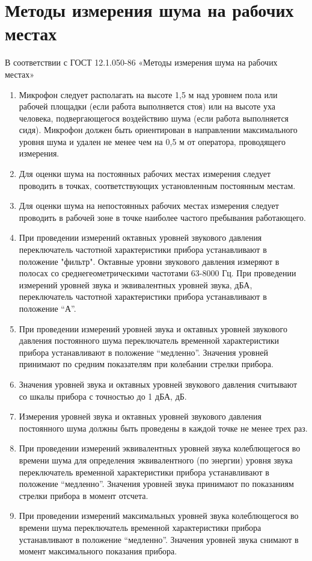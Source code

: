 \documentclass[a5paper, 12dd, twoside]{article}
\begin{document}
\section{Методы измерения шума на рабочих местах}
В соответствии с ГОСТ 12.1.050-86 «Методы измерения шума на рабочих местах»
\begin{enumerate}
    \item Микрофон следует располагать на высоте 1,5 м над уровнем пола или рабочей площадки (если работа выполняется стоя) или на высоте уха человека, подвергающегося воздействию шума (если работа выполняется сидя). Микрофон должен быть ориентирован в направлении максимального уровня шума и удален не менее чем на 0,5 м от оператора, проводящего измерения.
    \item Для оценки шума на постоянных рабочих местах измерения следует проводить в точках, соответствующих установленным постоянным местам.
    \item Для оценки шума на непостоянных рабочих местах измерения следует проводить в рабочей зоне в точке наиболее частого пребывания работающего.
    \item При проведении измерений октавных уровней звукового давления переключатель частотной характеристики прибора устанавливают в положение "фильтр". Октавные уровни звукового давления измеряют в полосах со среднегеометрическими частотами 63-8000 Гц. При проведении измерений уровней звука и эквивалентных уровней звука, дБА, переключатель частотной характеристики прибора устанавливают в положение ``А''.
    \item При проведении измерений уровней звука и октавных уровней звукового давления постоянного шума переключатель временной характеристики прибора устанавливают в положение ``медленно''. Значения уровней принимают по средним показателям при колебании стрелки прибора.
    \item Значения уровней звука и октавных уровней звукового давления считывают со шкалы прибора с точностью до 1 дБА, дБ.
    \item Измерения уровней звука и октавных уровней звукового давления постоянного шума должны быть проведены в каждой точке не менее трех раз.
    \item При проведении измерений эквивалентных уровней звука колеблющегося во времени шума для определения эквивалентного (по энергии) уровня звука переключатель временной характеристики прибора устанавливают в положение ``медленно''. Значения уровней звука принимают по показаниям стрелки прибора в момент отсчета.
    \item При проведении измерений максимальных уровней звука колеблющегося во времени шума переключатель временной характеристики прибора устанавливают в положение ``медленно''. Значения уровней звука снимают в момент максимального показания прибора.

\end{enumerate}
\end{document}
